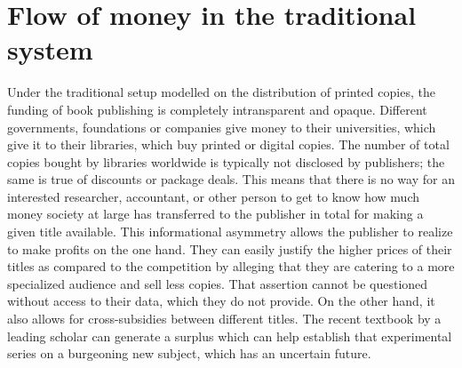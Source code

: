 \documentclass[12pt]{article}
\begin{document}
\section{Flow of money in the traditional system}
Under the traditional setup modelled on the distribution of printed copies, the funding of book publishing is completely intransparent and opaque. Different governments, foundations or companies give money to their universities, which give it to their libraries, which buy printed or digital copies. The number of total copies bought by libraries worldwide is typically not disclosed by publishers; the same is true of discounts or package deals. This means that there is no way for an interested researcher, accountant, or other person to get to know how much money society at large has transferred to the publisher in total for making a given title available.  This informational asymmetry allows the publisher to realize to make profits on the one hand. They can easily justify the higher prices of their titles as compared to the competition by alleging that they are catering to a more specialized audience and sell less copies. That assertion cannot be questioned without access to their data, which they do not provide. On the other hand, it also allows for cross-subsidies between different titles. The recent textbook by a leading scholar can generate a surplus which can help establish that experimental series on a burgeoning new subject, which has an uncertain future. 
\end{document}
